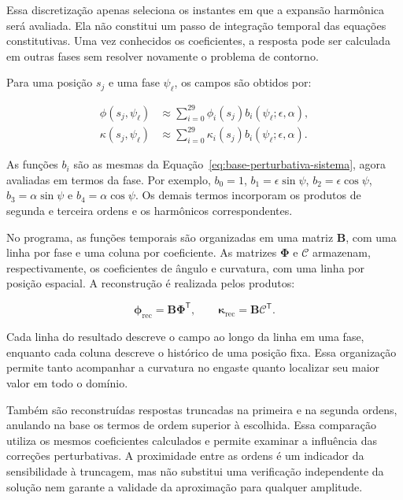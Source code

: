 \documentclass[arial,centeredequations,english,brazilian,oneside,section=TITLE]{ifes8}
\begin{document}
Essa discretização apenas seleciona os instantes em que a expansão harmônica
será avaliada. Ela não constitui um passo de integração temporal das equações
constitutivas. Uma vez conhecidos os coeficientes, a resposta pode ser
calculada em outras fases sem resolver novamente o problema de contorno.

Para uma posição $s_j$ e uma fase $\psi_\ell$, os campos são obtidos por:

\begin{align}
  \phi(s_j,\psi_\ell)&\approx
    \sum_{i=0}^{29}\phi_i(s_j)b_i(\psi_\ell;\epsilon,\alpha),
    \label{eq:reconstrucao-angulo-linear}\\
  \kappa(s_j,\psi_\ell)&\approx
    \sum_{i=0}^{29}\kappa_i(s_j)b_i(\psi_\ell;\epsilon,\alpha).
    \label{eq:reconstrucao-curvatura-linear}
\end{align}

As funções $b_i$ são as mesmas da
Equação~\eqref{eq:base-perturbativa-sistema}, agora avaliadas em termos da
fase. Por exemplo, $b_0=1$, $b_1=\epsilon\sin\psi$,
$b_2=\epsilon\cos\psi$, $b_3=\alpha\sin\psi$ e
$b_4=\alpha\cos\psi$. Os demais termos incorporam os produtos de segunda
e terceira ordens e os harmônicos correspondentes.

No programa, as funções temporais são organizadas em uma matriz
$\mathbf B$, com uma linha por fase e uma coluna por coeficiente. As matrizes
$\boldsymbol\Phi$ e $\boldsymbol{\mathcal C}$ armazenam, respectivamente,
os coeficientes de ângulo e curvatura, com uma linha por posição espacial.
A reconstrução é realizada pelos produtos:

\begin{equation}
  \boldsymbol\phi_{\mathrm{rec}}=\mathbf B\boldsymbol\Phi^{\mathsf T},
  \qquad
  \boldsymbol\kappa_{\mathrm{rec}}=\mathbf B\boldsymbol{\mathcal C}^{\mathsf T}.
  \label{eq:reconstrucao-matricial-linear}
\end{equation}

Cada linha do resultado descreve o campo ao longo da linha em uma fase,
enquanto cada coluna descreve o histórico de uma posição fixa. Essa organização
permite tanto acompanhar a curvatura no engaste quanto localizar seu maior
valor em todo o domínio.

Também são reconstruídas respostas truncadas na primeira e na segunda ordens,
anulando na base os termos de ordem superior à escolhida. Essa comparação
utiliza os mesmos coeficientes calculados e permite examinar a influência
das correções perturbativas. A proximidade entre as ordens é um indicador
da sensibilidade à truncagem, mas não substitui uma verificação independente
da solução nem garante a validade da aproximação para qualquer amplitude.
\end{document}
